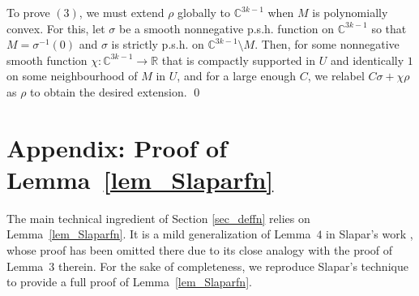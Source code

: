 \documentclass[10pt]{amsart}
\numberwithin{equation}{section}
\theoremstyle{definition}
\theoremstyle{definition}
\theoremstyle{plain}
\newcommand{\C} {\mathbb{C}}
\newcommand{\rl}{\mathbb{R}}
\begin{document}
To prove $(3)$, we must extend $\rho$ globally to $\C^{3k-1}$ when $M$ is polynomially convex. For this, let $\sigma$ be a smooth nonnegative p.s.h. function on $\C^{3k-1}$ so that $M=\sigma^{-1}(0)$ and $\sigma$ is strictly p.s.h. on $\C^{3k-1}\setminus M$. Then, for some nonnegative smooth function $\chi:\C^{3k-1}\rightarrow \rl$ that is compactly supported in $U$ and identically $1$ on some neighbourhood of $M$ in $U$, and for a large enough $C$, we relabel $C\sigma+\chi\rho$ as $\rho$ to obtain the desired extension.
\qed
\section{Appendix: Proof of Lemma~\ref{lem_Slaparfn}}\label{sec_append}
The main technical ingredient of Section \ref{sec_deffn} relies on Lemma~\ref{lem_Slaparfn}. It is a mild generalization of Lemma~$4$ in Slapar's work \cite{Sl04}, whose proof has been omitted there due to its close analogy with the proof of Lemma~$3$ therein. For the sake of completeness, we reproduce Slapar's technique to provide a full proof of Lemma~\ref{lem_Slaparfn}. 
\end{document}
